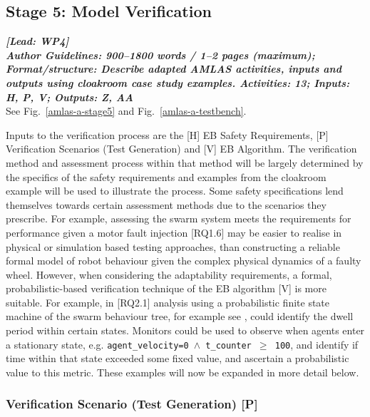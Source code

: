 \documentclass[lettersize,journal]{IEEEtran}
\begin{document}
\subsection{Stage 5: Model Verification} \label{framework-stage5}
\noindent \textbf{\textit{[Lead:  WP4]}}\\ 
\noindent\textbf{\textit{Author Guidelines: 900–1800 words / 1–2 pages (maximum); \\Format/structure: Describe adapted AMLAS activities, inputs and outputs using cloakroom case study examples. Activities: 13; Inputs: H, P, V; Outputs: Z, AA}}\\
See Fig.~\ref{amlas-a-stage5} and Fig.~\ref{amlas-a-testbench}.	


Inputs to the verification process are the [H] EB Safety Requirements, [P] Verification Scenarios (Test Generation) and [V] EB Algorithm. 
%
The verification method and assessment process within that method will be largely determined by the specifics of the safety requirements and examples from the cloakroom example will be used to illustrate the process. Some safety specifications lend themselves towards certain assessment methods due to the scenarios they prescribe.
%
For example, assessing the swarm system meets the requirements for performance given a motor fault injection [RQ1.6] may be easier to realise in physical or simulation based testing approaches, than constructing a reliable formal model of robot behaviour given the complex physical dynamics of a faulty wheel. 
%
However, when considering the adaptability requirements, a formal, probabilistic-based verification technique of the EB algorithm [V] is more suitable. For example, in [RQ2.1] analysis using a probabilistic finite state machine of the swarm behaviour tree, for example see \cite{Hoffmann2016,Calinescu2018}, could identify the dwell period within certain states. Monitors could be used to observe when agents enter a stationary state, e.g. \texttt{agent\_velocity=0 $\land $  t\_counter  $\ge$ 100}, and identify if time within that state exceeded some fixed value, and ascertain a probabilistic value to this metric.
%
These examples will now be expanded in more detail below.

\subsubsection{Verification Scenario (Test Generation) [P]}
\end{document}
